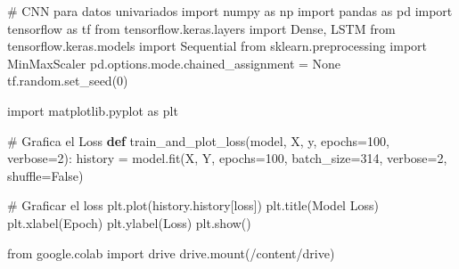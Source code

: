 \documentclass[
  us-letterpaper,
]{scrreprt}
\newenvironment{Shaded}{\begin{snugshade}}{\end{snugshade}}
\newcommand{\CommentTok}[1]{\textcolor[rgb]{0.37,0.37,0.37}{#1}}
\newcommand{\DecValTok}[1]{\textcolor[rgb]{0.68,0.00,0.00}{#1}}
\newcommand{\ImportTok}[1]{\textcolor[rgb]{0.00,0.46,0.62}{#1}}
\newcommand{\KeywordTok}[1]{\textcolor[rgb]{0.00,0.23,0.31}{\textbf{#1}}}
\newcommand{\NormalTok}[1]{\textcolor[rgb]{0.00,0.23,0.31}{#1}}
\newcommand{\OperatorTok}[1]{\textcolor[rgb]{0.37,0.37,0.37}{#1}}
\newcommand{\StringTok}[1]{\textcolor[rgb]{0.13,0.47,0.30}{#1}}
\newcommand{\VariableTok}[1]{\textcolor[rgb]{0.07,0.07,0.07}{#1}}
\theoremstyle{plain}
\theoremstyle{definition}
\theoremstyle{definition}
\theoremstyle{remark}
\begin{document}
\begin{Shaded}
\begin{Highlighting}[]
\CommentTok{\# CNN para datos univariados }
\ImportTok{import}\NormalTok{ numpy }\ImportTok{as}\NormalTok{ np}
\ImportTok{import}\NormalTok{ pandas }\ImportTok{as}\NormalTok{ pd}
\ImportTok{import}\NormalTok{ tensorflow }\ImportTok{as}\NormalTok{ tf}
\ImportTok{from}\NormalTok{ tensorflow.keras.layers }\ImportTok{import}\NormalTok{ Dense, LSTM}
\ImportTok{from}\NormalTok{ tensorflow.keras.models }\ImportTok{import}\NormalTok{ Sequential}
\ImportTok{from}\NormalTok{ sklearn.preprocessing }\ImportTok{import}\NormalTok{ MinMaxScaler}
\NormalTok{pd.options.mode.chained\_assignment }\OperatorTok{=} \VariableTok{None}
\NormalTok{tf.random.set\_seed(}\DecValTok{0}\NormalTok{)}

\ImportTok{import}\NormalTok{ matplotlib.pyplot }\ImportTok{as}\NormalTok{ plt}

\CommentTok{\# Grafica el Loss}
\KeywordTok{def}\NormalTok{ train\_and\_plot\_loss(model, X, y, epochs}\OperatorTok{=}\DecValTok{100}\NormalTok{, verbose}\OperatorTok{=}\DecValTok{2}\NormalTok{):}
\NormalTok{    history }\OperatorTok{=}\NormalTok{ model.fit(X, Y, epochs}\OperatorTok{=}\DecValTok{100}\NormalTok{, }
\NormalTok{    batch\_size}\OperatorTok{=}\DecValTok{314}\NormalTok{, verbose}\OperatorTok{=}\DecValTok{2}\NormalTok{, shuffle}\OperatorTok{=}\VariableTok{False}\NormalTok{)}


    \CommentTok{\# Graficar el loss}
\NormalTok{    plt.plot(history.history[}\StringTok{\textquotesingle{}loss\textquotesingle{}}\NormalTok{])}
\NormalTok{    plt.title(}\StringTok{\textquotesingle{}Model Loss\textquotesingle{}}\NormalTok{)}
\NormalTok{    plt.xlabel(}\StringTok{\textquotesingle{}Epoch\textquotesingle{}}\NormalTok{)}
\NormalTok{    plt.ylabel(}\StringTok{\textquotesingle{}Loss\textquotesingle{}}\NormalTok{)}
\NormalTok{    plt.show()}

\ImportTok{from}\NormalTok{ google.colab }\ImportTok{import}\NormalTok{ drive}
\NormalTok{drive.mount(}\StringTok{\textquotesingle{}/content/drive\textquotesingle{}}\NormalTok{)}


\end{Highlighting}
\end{Shaded}
\end{document}
